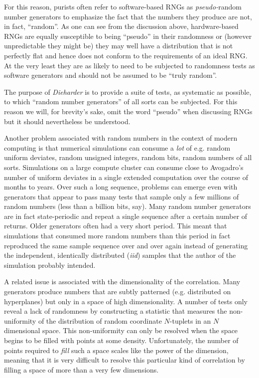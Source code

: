 \documentclass[12pt]{book}
\begin{document}
For this reason, purists often refer to software-based RNGs as {\em
pseudo-}random number generators to emphasize the fact that the numbers
they produce are not, in fact, ``random''.  As one can see from the
discussion above, hardware-based RNGs are equally susceptible to being
``pseudo'' in their randomness or (however unpredictable they might be)
they may well have a distribution that is not perfectly flat and hence
does not conform to the requirements of an ideal RNG.  At the very least
they are as likely to need to be subjected to randomness tests as
software generators and should not be assumed to be ``truly random''.

The purpose of {\em Dieharder} is to provide a suite of tests, as
systematic as possible, to which ``random number generators'' of all
sorts can be subjected.  For this reason we will, for brevity's sake,
omit the word ``pseudo'' when discussing RNGs but it should nevertheless
be understood.

Another problem associated with random numbers in the context of modern
computing is that numerical simulations can consume a {\em lot} of e.g.
random uniform deviates, random unsigned integers, random bits, random
numbers of all sorts.  Simulations on a large compute cluster can
consume close to Avogadro's number of uniform deviates in a single
extended computation over the course of months to years.  Over such a
long sequence, problems can emerge even with generators that appear to
pass many tests that sample only a few millions of random numbers (less
than a billion bits, say).  Many random number generators are in fact
state-periodic and repeat a single sequence after a certain number of
returns.  Older generators often had a very short period.  This meant
that simulations that consumed more random numbers than this period in
fact reproduced the same sample sequence over and over again instead of
generating the independent, identically distributed ({\em iid}) samples
that the author of the simulation probably intended.

A related issue is associated with the dimensionality of the
correlation.  Many generators produce numbers that are subtly patterned
(e.g. distributed on hyperplanes) but only in a space of high
dimensionality.  A number of tests only reveal a lack of randomness by
constructing a statistic that measures the non-uniformity of the
distribution of random coordinate $N$-tuplets in an $N$ dimensional
space.  This non-uniformity can only be resolved when the space begins
to be filled with points at some density.  Unfortunately, the number of
points required to {\em fill} such a space scales like the power of the
dimension, meaning that it is very difficult to resolve this particular
kind of correlation by filling a space of more than a very few
dimensions.
\end{document}
